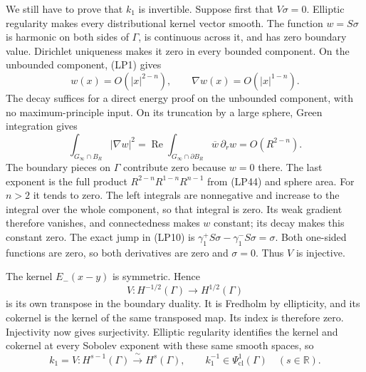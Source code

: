 \documentclass[
  11pt,
]{article}
\begin{document}
We still have to prove that \(k_1\) is invertible. Suppose first that
\(V\sigma=0\). Elliptic regularity makes every distributional kernel
vector smooth. The function \(w=S\sigma\) is harmonic on both sides of
\(\Gamma\), is continuous across it, and has zero boundary value.
Dirichlet uniqueness makes it zero in every bounded component. On the
unbounded component, (LP1) gives \[
 w(x)=O(|x|^{2-n}),\qquad \nabla w(x)=O(|x|^{1-n}).
 \tag{LP44}
\] The decay suffices for a direct energy proof on the unbounded
component, with no maximum-principle input. On its truncation by a large
sphere, Green integration gives \[
 \int_{G_\infty\cap B_R}|\nabla w|^2
  =\operatorname{Re}\int_{G_\infty\cap\partial B_R}
                   \overline w\,\partial_r w
  =O(R^{2-n}).
 \tag{BR4}
\] The boundary pieces on \(\Gamma\) contribute zero because \(w=0\)
there. The last exponent is the full product \(R^{2-n}R^{1-n}R^{n-1}\)
from (LP44) and sphere area. For \(n>2\) it tends to zero. The left
integrals are nonnegative and increase to the integral over the whole
component, so that integral is zero. Its weak gradient therefore
vanishes, and connectedness makes \(w\) constant; its decay makes this
constant zero. The exact jump in (LP10) is
\(\gamma_1^+S\sigma-\gamma_1^-S\sigma=\sigma\). Both one-sided functions
are zero, so both derivatives are zero and \(\sigma=0\). Thus \(V\) is
injective.

The kernel \(E_-(x-y)\) is symmetric. Hence \[
 V:H^{-1/2}(\Gamma)\longrightarrow H^{1/2}(\Gamma)
 \tag{LP45}
\] is its own transpose in the boundary duality. It is Fredholm by
ellipticity, and its cokernel is the kernel of the same transposed map.
Its index is therefore zero. Injectivity now gives surjectivity.
Elliptic regularity identifies the kernel and cokernel at every Sobolev
exponent with these same smooth spaces, so \[
 k_1=V:H^{s-1}(\Gamma)\xrightarrow{\;\sim\;}H^s(\Gamma),\qquad
 k_1^{-1}\in\Psi^1_{\mathrm{cl}}(\Gamma)\quad(s\in\mathbb R).
 \tag{LP46}
\]
\end{document}
